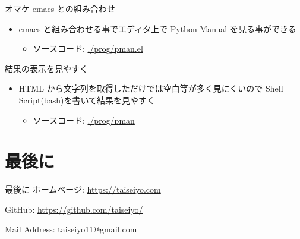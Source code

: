 \documentclass[compress,dvipdfmx,11pt]{beamer}
\begin{document}
\begin{frame}[label={sec:org5072e37}]{オマケ}
emacs との組み合わせ
\begin{itemize}
\item emacs と組み合わせる事でエディタ上で Python Manual を見る事ができる
\begin{itemize}
\item ソースコード: \url{./prog/pman.el}
\end{itemize}
\end{itemize}

結果の表示を見やすく
\begin{itemize}
\item HTML から文字列を取得しただけでは空白等が多く見にくいので Shell
Script(bash)を書いて結果を見やすく
\begin{itemize}
\item ソースコード:  \url{./prog/pman}
\end{itemize}
\end{itemize}
\end{frame}


\section{最後に}
\label{sec:org3aebd97}
\begin{frame}[label={sec:orga1e447b}]{最後に}
ホームページ: \url{https://taiseiyo.com}


GitHub: \url{https://github.com/taiseiyo/}


Mail Address: taiseiyo11@gmail.com
\end{frame}
\end{document}
